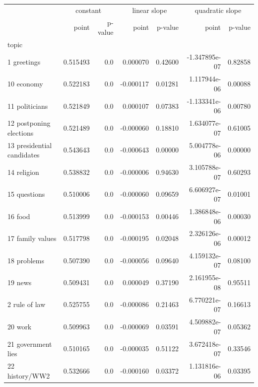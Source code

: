 \documentclass{article}
\begin{document}
\begin{longtable}{lrrrrrr}
	\toprule
	 & \multicolumn{2}{c}{constant} & \multicolumn{2}{c}{linear slope} & \multicolumn{2}{c}{quadratic slope} \\
	{} &     point & p-value &        point &  p-value &           point &  p-value \\
	topic                      &           &         &              &          &                 &          \\
	\midrule
	1 greetings                &  0.515493 &     0.0 &     0.000070 &  0.42600 &   -1.347895e-07 &  0.82858 \\
	10 economy                 &  0.522183 &     0.0 &    -0.000117 &  0.01281 &    1.117944e-06 &  0.00088 \\
	11 politicians             &  0.521849 &     0.0 &     0.000107 &  0.07383 &   -1.133341e-06 &  0.00780 \\
	12 postponing elections    &  0.521489 &     0.0 &    -0.000060 &  0.18810 &    1.634077e-07 &  0.61005 \\
	13 presidential candidates &  0.543643 &     0.0 &    -0.000643 &  0.00000 &    5.004778e-06 &  0.00000 \\
	14 religion                &  0.538832 &     0.0 &    -0.000006 &  0.94630 &    3.105788e-07 &  0.60293 \\
	15 questions               &  0.510006 &     0.0 &    -0.000060 &  0.09659 &    6.606927e-07 &  0.01001 \\
	16 food                    &  0.513999 &     0.0 &    -0.000153 &  0.00446 &    1.386848e-06 &  0.00030 \\
	17 family values           &  0.517798 &     0.0 &    -0.000195 &  0.02048 &    2.326126e-06 &  0.00012 \\
	18 problems                &  0.507390 &     0.0 &    -0.000056 &  0.09640 &    4.159132e-07 &  0.08100 \\
	19 news                    &  0.509431 &     0.0 &     0.000049 &  0.37190 &    2.161955e-08 &  0.95511 \\
	2 rule of law              &  0.525755 &     0.0 &    -0.000086 &  0.21463 &    6.770221e-07 &  0.16613 \\
	20 work                    &  0.509963 &     0.0 &    -0.000069 &  0.03591 &    4.509882e-07 &  0.05362 \\
	21 government lies         &  0.510165 &     0.0 &    -0.000035 &  0.51122 &    3.672418e-07 &  0.33546 \\
	22 history/WW2             &  0.532666 &     0.0 &    -0.000160 &  0.03372 &    1.131816e-06 &  0.03395 \\

\end{longtable}
\end{document}
